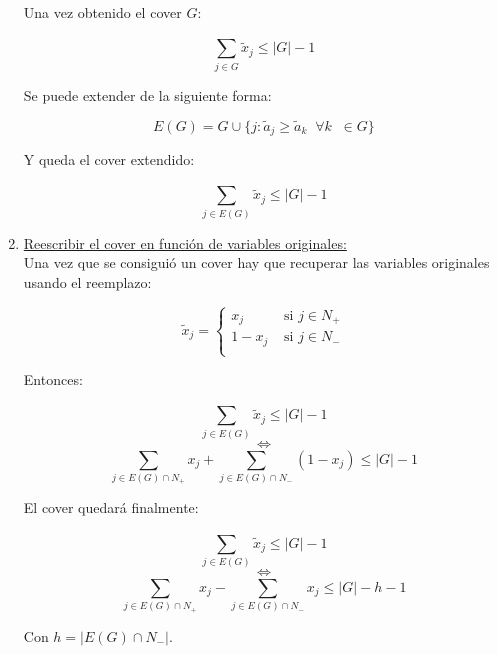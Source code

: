 \begin{enumerate}
Una vez obtenido el cover $G$:

$$\overset{}{\underset{j \in G}{\sum}} \tilde{x}_j \leq |G|-1$$

Se puede extender de la siguiente forma:

$$E(G) = G \cup \{j: \tilde{a}_j \geq \tilde{a}_k \;\;\forall k\;\; \in G\}$$

Y queda el cover extendido:

$$\overset{}{\underset{j \in E(G)}{\sum}} \tilde{x}_j \leq |G|-1$$

\item \underline{Reescribir el cover en función de variables originales:}\\
Una vez que se consiguió un cover hay que recuperar las variables originales usando el reemplazo:

$$\tilde{x}_j = 
\begin{cases}
x_j & \text{ si } j \in N_+\\
1-x_j & \text{ si } j \in N_-\\
\end{cases}$$

Entonces:

$$\overset{}{\underset{j \in E(G)}{\sum}} \tilde{x}_j \leq |G| - 1$$
$$\Leftrightarrow$$
$$\overset{}{\underset{j \in E(G)\cap N_+}{\sum}}x_j + \overset{}{\underset{j \in E(G)\cap N_-}{\sum}} (1-x_j) \leq |G|-1$$

El cover quedará finalmente:

$$\overset{}{\underset{j\in E(G)}{\sum}} \tilde{x}_j \leq |G|-1$$
$$\Leftrightarrow$$
$$\overset{}{\underset{j\in E(G)\cap N_+}{\sum}} x_j - \overset{}{\underset{j \in E(G)\cap N_-}{\sum}} x_j \leq |G| - h -1$$

Con $h = |E(G)\cap N_-|$.
\end{enumerate}
